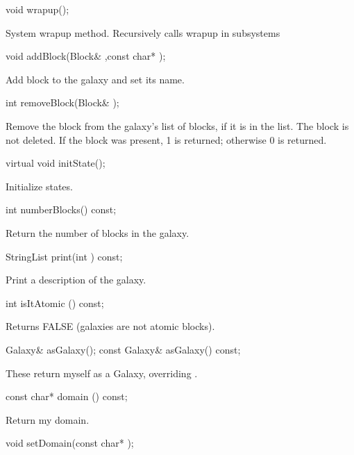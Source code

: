 \begin{example}
void wrapup();
\end{example}

System wrapup method.  Recursively calls wrapup in subsystems

\begin{example}
void addBlock(Block& ,const char* );
\end{example}

Add block to the galaxy and set its name.

\begin{example}
int removeBlock(Block& );
\end{example}

Remove the block  from the galaxy's list of blocks, if it is in
the list.  The block is not deleted.  If the block was present, 1 is
returned; otherwise 0 is returned.

\begin{example}
virtual void initState();
\end{example}

Initialize states.

\begin{example}
int numberBlocks() const;
\end{example}

Return the number of blocks in the galaxy.

\begin{example}
StringList print(int ) const;
\end{example}

Print a description of the galaxy.

\begin{example}
int isItAtomic () const;
\end{example}

Returns FALSE (galaxies are not atomic blocks).

\begin{example}
Galaxy& asGalaxy();
const Galaxy& asGalaxy() const;
\end{example}

These return myself as a Galaxy, overriding .

\begin{example}
const char* domain () const;
\end{example}

Return my domain.

\begin{example}
void setDomain(const char* );
\end{example}

